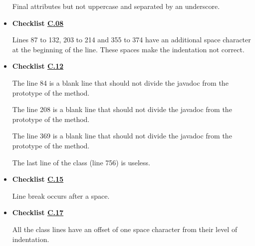 \documentclass[../../../../codeInspection.tex]{subfiles}
\begin{document}
\begin{itemize}
		    	  

		    	  

		    	  

		    	  Final attributes but not uppercase and separated by an underscore.

		    \item \textbf{Checklist \hyperref[C:08]{C.08}}

		    	  Lines 87 to 132, 203 to 214 and 355 to 374 have an additional space character at the beginning of the line. These spaces make the indentation not correct.

		    \item \textbf{Checklist \hyperref[C:12]{C.12}}

		    	  

		    	  The line 84 is a blank line that should not divide the javadoc from the prototype of the method.

		    	  

		    	  The line 208 is a blank line that should not divide the javadoc from the prototype of the method.

		    	  

		    	  The line 369 is a blank line that should not divide the javadoc from the prototype of the method.

		    	  The last line of the class (line 756) is useless.

		    \item \textbf{Checklist \hyperref[C:15]{C.15}}

		    	  

		    	  Line break occurs after a space.

		    \item \textbf{Checklist \hyperref[C:17]{C.17}}

		    	  All the class lines have an offset of one space character from their level of indentation.


\end{itemize}
\end{document}
